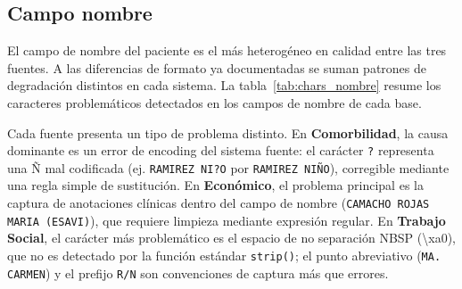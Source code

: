 \subsection{Campo nombre}

El campo de nombre del paciente es el más heterogéneo en calidad entre las tres fuentes. A las diferencias de formato ya documentadas se suman patrones de degradación distintos en cada sistema. La tabla~\ref{tab:chars_nombre} resume los caracteres problemáticos detectados en los campos de nombre de cada base.

\begin{table}[H]
\centering
\caption{Caracteres problemáticos en campos de nombre por fuente}
\label{tab:chars_nombre}
\small
{}
\end{table}

Cada fuente presenta un tipo de problema distinto. En \textbf{Comorbilidad}, la causa dominante es un error de encoding del sistema fuente: el carácter \texttt{?} representa una Ñ mal codificada (ej. \texttt{RAMIREZ NI?O} por \texttt{RAMIREZ NIÑO}), corregible mediante una regla simple de sustitución. En \textbf{Económico}, el problema principal es la captura de anotaciones clínicas dentro del campo de nombre (\texttt{CAMACHO ROJAS MARIA (ESAVI)}), que requiere limpieza mediante expresión regular. En \textbf{Trabajo Social}, el carácter más problemático es el espacio de no separación NBSP (\textbackslash xa0), que no es detectado por la función estándar \texttt{strip()}; el punto abreviativo (\texttt{MA. CARMEN}) y el prefijo \texttt{R/N} son convenciones de captura más que errores.

